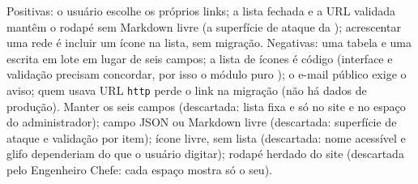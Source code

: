 {Positivas: o usuário escolhe os próprios links; a lista fechada e a URL validada mantêm o rodapé sem Markdown livre (a superfície de ataque da ); acrescentar uma rede é incluir um ícone na lista, sem migração. Negativas: uma tabela e uma escrita em lote em lugar de seis campos; a lista de ícones é código (interface e validação precisam concordar, por isso o módulo puro ); o e-mail público exige o aviso; quem usava URL \texttt{http} perde o link na migração (não há dados de produção).}
{Manter os seis campos (descartada: lista fixa e só no site e no espaço do administrador); campo JSON ou Markdown livre (descartada: superfície de ataque e validação por item); ícone livre, sem lista (descartada: nome acessível e glifo dependeriam do que o usuário digitar); rodapé herdado do site (descartada pelo Engenheiro Chefe: cada espaço mostra só o seu).}


